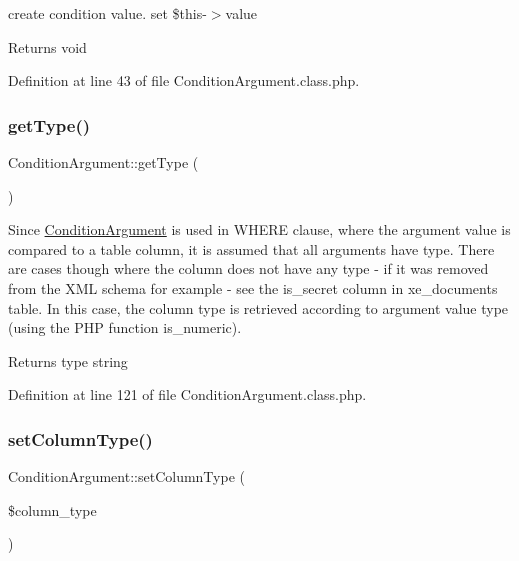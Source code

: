 create condition value. set \$this-\/$>$value \begin{DoxyReturn}{Returns}
void 
\end{DoxyReturn}


Definition at line 43 of file Condition\+Argument.\+class.\+php.

\hypertarget{classConditionArgument_a39922137cc67e751a5577850bce3cac7}{}\label{classConditionArgument_a39922137cc67e751a5577850bce3cac7} 
\subsubsection{\texorpdfstring{get\+Type()}{getType()}}
{\footnotesize\ttfamily Condition\+Argument\+::get\+Type (\begin{DoxyParamCaption}{ }\end{DoxyParamCaption})}

Since \hyperlink{classConditionArgument}{Condition\+Argument} is used in W\+H\+E\+RE clause, where the argument value is compared to a table column, it is assumed that all arguments have type. There are cases though where the column does not have any type -\/ if it was removed from the X\+ML schema for example -\/ see the is\+\_\+secret column in xe\+\_\+documents table. In this case, the column type is retrieved according to argument value type (using the P\+HP function is\+\_\+numeric).

\begin{DoxyReturn}{Returns}
type string 
\end{DoxyReturn}


Definition at line 121 of file Condition\+Argument.\+class.\+php.

\hypertarget{classConditionArgument_a7ee8444a1bfa4763458a006e0fd6ef1e}{}\label{classConditionArgument_a7ee8444a1bfa4763458a006e0fd6ef1e} 
\subsubsection{\texorpdfstring{set\+Column\+Type()}{setColumnType()}}
{\footnotesize\ttfamily Condition\+Argument\+::set\+Column\+Type (\begin{DoxyParamCaption}\item[{}]{\$column\+\_\+type }\end{DoxyParamCaption})}



